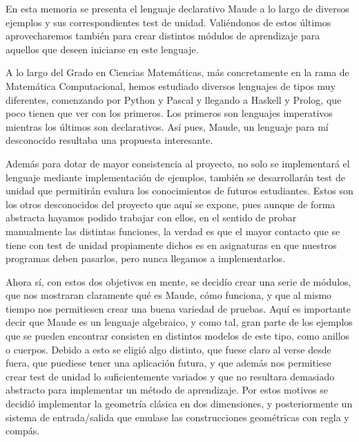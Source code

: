 
En esta memoria se presenta el lenguaje declarativo Maude a lo largo de diversos ejemplos y sus correspondientes test de unidad. Valiéndonos de estos últimos aprovecharemos también para crear distintos módulos de aprendizaje para aquellos que deseen iniciarse en este lenguaje.\par

A lo largo del Grado en Ciencias Matemáticas, más concretamente en la rama de Matemática Computacional, hemos estudiado diversos lenguajes de tipos muy diferentes, comenzando por Python y Pascal y llegando a Haskell y Prolog, que poco tienen que ver con los primeros. Los primeros son lenguajes imperativos mientras los últimos son declarativos. Así pues, Maude, un lenguaje para mí desconocido resultaba una propuesta interesante.\par

Además para dotar de mayor consistencia al proyecto, no solo se implementará el lenguaje mediante implementación de ejemplos, también se desarrollarán test de unidad que permitirán evalura los conocimientos de futuros estudiantes. Estos son los otros desconocidos del proyecto que aquí se expone, pues aunque de forma abstracta hayamos podido trabajar con ellos, en el sentido de probar manualmente las distintas funciones, la verdad es que el mayor contacto que se tiene con test de unidad propiamente dichos es en asignaturas en que nuestros programas deben pasarlos, pero nunca llegamos a implementarlos. \par

Ahora sí, con estos dos objetivos en mente, se decidío crear una serie de módulos, que nos mostraran claramente qué es Maude, cómo funciona, y que al mismo tiempo nos permitiesen crear una buena variedad de pruebas. Aquí es importante decir que Maude es un lenguaje algebraico, y como tal, gran parte de los ejemplos que se pueden encontrar consisten en distintos modelos de este tipo, como anillos o cuerpos. Debido a esto se eligió algo distinto, que fuese claro al verse desde fuera, que puediese tener una aplicación futura, y que además nos permitiese crear test de unidad lo suficientemente variados y que no resultara demasiado abstracto para implementar un método de aprendizaje. Por estos motivos se decidió implementar la geometría clásica en dos dimensiones, y posteriormente un sistema de entrada/salida que emulase las construcciones geométricas con regla y compás. \par

